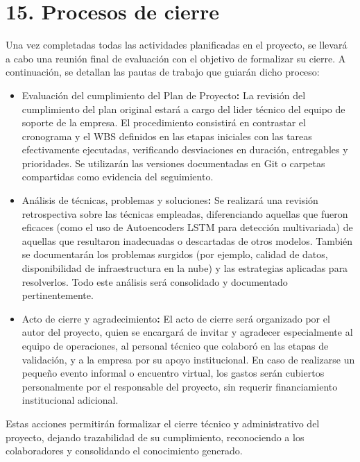\documentclass[
11pt, %
]{charter}
\begin{document}
\section{15. Procesos de cierre}    
\label{sec:cierre}


Una vez completadas todas las actividades planificadas en el proyecto, se llevará a cabo una reunión final de evaluación con el objetivo de formalizar su cierre. A continuación, se detallan las pautas de trabajo que guiarán dicho proceso:

\begin{itemize}
    \item Evaluación del cumplimiento del Plan de Proyecto\textbf{:}  
    La revisión del cumplimiento del plan original estará a cargo del lider técnico del equipo de soporte de la empresa. El procedimiento consistirá en contrastar el cronograma y el WBS definidos en las etapas iniciales con las tareas efectivamente ejecutadas, verificando desviaciones en duración, entregables y prioridades. Se utilizarán las versiones documentadas en Git o carpetas compartidas como evidencia del seguimiento.

    \item Análisis de técnicas, problemas y soluciones\textbf{:}  
    Se realizará una revisión retrospectiva sobre las técnicas empleadas, diferenciando aquellas que fueron eficaces (como el uso de Autoencoders LSTM para detección multivariada) de aquellas que resultaron inadecuadas o descartadas de otros modelos. También se documentarán los problemas surgidos (por ejemplo, calidad de datos, disponibilidad de infraestructura en la nube) y las estrategias aplicadas para resolverlos. Todo este análisis será consolidado y documentado pertinentemente.

    \item Acto de cierre y agradecimiento\textbf{:}  
    El acto de cierre será organizado por el autor del proyecto, quien se encargará de invitar y agradecer especialmente al equipo de operaciones, al personal técnico que colaboró en las etapas de validación, y a la empresa por su apoyo institucional. En caso de realizarse un pequeño evento informal o encuentro virtual, los gastos serán cubiertos personalmente por el responsable del proyecto, sin requerir financiamiento institucional adicional.
\end{itemize}

Estas acciones permitirán formalizar el cierre técnico y administrativo del proyecto, dejando trazabilidad de su cumplimiento, reconociendo a los colaboradores y consolidando el conocimiento generado.
\end{document}
